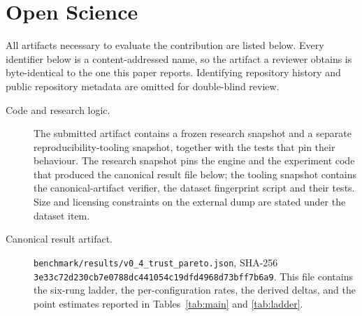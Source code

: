 \documentclass[letterpaper,twocolumn,10pt]{article}
\newcommand{\hb}{\allowbreak}
\begin{document}
\cleardoublepage

\section*{Open Science}

All artifacts necessary to evaluate the contribution are listed below. Every
identifier below is a content-addressed name, so the artifact a reviewer
obtains is byte-identical to the one this paper reports. Identifying
repository history and public repository metadata are omitted for double-blind
review.

\begin{description}


\item[Code and research logic.] The submitted artifact contains a frozen
research snapshot and a separate reproducibility-tooling snapshot, together
with the tests that pin their behaviour. The research snapshot pins the engine
and the experiment code that produced the canonical result file below; the
tooling snapshot contains the canonical-artifact verifier, the dataset
fingerprint script and their tests. Size and licensing constraints on the
external dump are stated under the dataset item.

\item[Canonical result artifact.]
\texttt{benchmark/results/v0\_4\_trust\_pareto.json}, SHA-256
\texttt{3e33\hb c72d\hb 230c\hb b7e0\hb 788d\hb c441\hb 2574\hb 054c\hb 19df\hb d496\hb 5465\hb 7369\hb 8d73\hb bff7\hb b6a9\hb 0565}.
This
file contains the six-rung ladder, the per-configuration rates, the derived
deltas, and the point estimates reported in Tables~\ref{tab:main} and
\ref{tab:ladder}.


\end{description}
\end{document}
